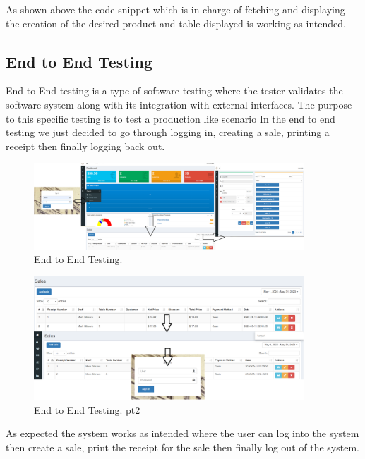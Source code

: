As shown above the code snippet which is in charge of fetching and displaying the creation of the desired product and table displayed is working as intended.

\subsection{End to End Testing}
End to End testing is a type of software testing where the tester validates the software system along with its integration with external interfaces. The purpose to this specific testing is to test a production like scenario
\newline
\newline
In the end to end testing we just decided to go through logging in, creating a sale, printing a receipt then finally logging back out.
\newline
\newline


\begin{figure}[h!]
	\caption{End to End Testing.}
	\label{image:myImageName}
	\centering
	\includegraphics[width=0.9\textwidth]{Fig images/endTOend1-5.png}
\end{figure}
\begin{figure}[h!]
	\caption{End to End Testing. pt2}
	\label{image:myImageName}
	\centering
	\includegraphics[width=0.9\textwidth]{Fig images/endTOend6-8.png}
\end{figure}


As expected the system works as intended where the user can log into the system then create a sale, print the receipt for the sale then finally log out of the system.


